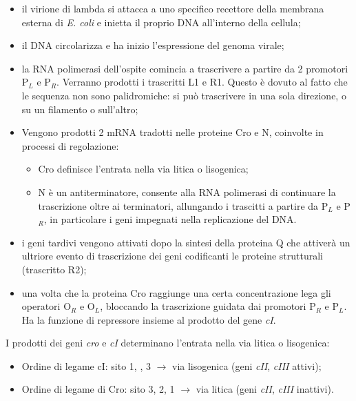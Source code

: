 \begin{itemize}
    \item il virione di lambda si attacca a uno specifico recettore della membrana esterna di \textit{E. coli} e inietta il proprio DNA all'interno della cellula;
    \item il DNA circolarizza e ha inizio l'espressione del genoma virale; 
    \item la RNA polimerasi dell'ospite comincia a trascrivere a partire da 2 promotori P$_L$ e P$_R$. Verranno prodotti i trascritti L1 e R1. Questo è dovuto al fatto che le sequenza non sono palidromiche: si può trascrivere in una sola direzione, o su un filamento o sull'altro;
    \item Vengono prodotti 2 mRNA tradotti nelle proteine Cro e N, coinvolte in processi di regolazione:
    \begin{itemize}
        \item Cro definisce l'entrata nella via litica o lisogenica;
        \item N è un antiterminatore, consente alla RNA polimerasi di continuare la trascrizione oltre ai terminatori, allungando i trascitti a partire da P$_L$ e P$_R$, in particolare i geni impegnati nella replicazione del DNA.
    \end{itemize}
    \item i geni tardivi vengono attivati dopo la sintesi della proteina Q che attiverà un ultriore evento di trascrizione dei geni codificanti le proteine strutturali (trascritto R2); 
    \item una volta che la proteina Cro raggiunge una certa concentrazione lega gli operatori O$_R$ e O$_L$, bloccando la trascrizione guidata dai promotori P$_R$ e P$_L$. Ha la funzione di repressore insieme al prodotto del gene \textit{cI}.
\end{itemize}
I prodotti dei geni \textit{cro} e \textit{cI} determinano l'entrata nella via litica o lisogenica:
\begin{itemize}
    \item Ordine di legame cI: sito 1, , 3 $\xrightarrow{}$ via lisogenica (geni \textit{cII}, \textit{cIII} attivi);
    \item Ordine di legame di Cro: sito 3, 2, 1 $\xrightarrow{}$ via litica (geni \textit{cII}, \textit{cIII} inattivi).
\end{itemize}
